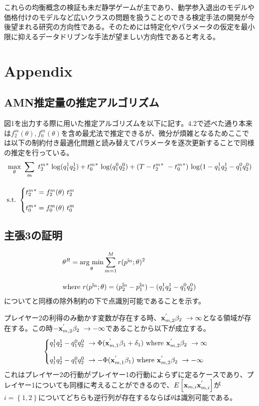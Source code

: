 \documentclass{jsarticle}
\newcommand{\argmin}{\mathop{\rm arg~min}\limits}
\begin{document}
これらの均衡概念の検証も未だ静学ゲームが主であり、動学参入退出のモデルや価格付けのモデルなど広いクラスの問題を扱うことのできる検定手法の開発が今後望まれる研究の方向性である。そのためには特定化やパラメータの仮定を最小限に抑えるデータドリブンな手法が望ましい方向性であると考える。

\section{Appendix}
\subsection{AMN推定量の推定アルゴリズム}
図1を出力する際に用いた推定アルゴリズムを以下に記す。$4.2$で述べた通り本来は$f_2^m(\theta), f_0^m(\theta)$を含め最尤法で推定できるが、微分が煩雑となるためここでは以下の制約付き最適化問題と読み替えてパラメータを逐次更新することで同様の推定を行っている。
\begin{align*}
	&\max_{\theta}\ \sum_m\ {t_2^m}^{*}\ {\rm log} (q_1^1 q_2^1) + {t_0^m}^{*}\ {\rm log} (q_1^0 q_2^0) + (T - {t_2^m}^{*}\ - {t_0^m}^{*})\ {\rm log} (1- q_1^1 q_2^1 - q_1^0 q_2^0)\\[10pt]
	&\text{s.t.}\ \begin{cases}
	{t_2^m}^{*} = f_2^m(\theta)\ t_2^m\\[8pt]
	{t_0^m}^{*} = f_0^m(\theta)\ t_0^m
	\end{cases}
\end{align*}



\subsection{主張3の証明}
\begin{align*}
	&\theta^R = \argmin_{\theta} \sum_{m = 1}^M r(\hat{p^m} ; \theta)^2\\[10pt]
	&\text{where}\ r(\hat{p^m} ; \theta) = (\hat{p_2^m} - \hat{p_1^m}) - (q_1^1 q_2^1 - q_1^0 q_2^0)
\end{align*}
について\cite{Tamer2003a}と同様の除外制約の下で点識別可能であることを示す。

プレイヤー2の利得のみ動かす変数が存在する時、${\bf x}_{m, 2}^{'} \beta_2\ \to \infty$となる領域が存在する。この時$-{\bf x}_{m, 2}^{'} \beta_2\ \to -\infty$であることから以下が成立する。
\begin{align*}
\begin{cases}
	q_1^1 q_2^1 - q_1^0 q_2^0\ \to \Phi({\bf x}_{m, 1}^{'} \beta_1 + \delta_1)\ \text{where}\ {\bf x}_{m, 2}^{'} \beta_2\ \to \infty\\[10pt]
	q_1^1 q_2^1 - q_1^0 q_2^0\ \to -\Phi({\bf x}_{m, 1}^{'} \beta_1)\ \text{where}\ {\bf x}_{m, 2}^{'} \beta_2\ \to -\infty
\end{cases}
\end{align*}
これはプレイヤー2の行動がプレイヤー1の行動によらずに定るケースであり、プレイヤー1についても同様に考えることができるので、$E\left[ {\bf x}_{m, i} {\bf x}_{m, i}^{'} \right]$が$i = \left\{ 1,2 \right\}$についてどちらも逆行列が存在するならば$\theta$は識別可能である。
\end{document}
